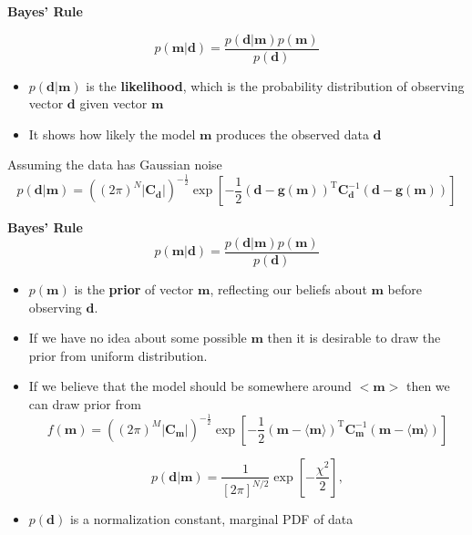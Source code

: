 \documentclass[aspectratio=169]{beamer}
\begin{document}
\begin{frame}{\textbf{Bayes' Rule}} 

\[ p(\mathbf{m}| \mathbf{d}) = \frac{ p(\mathbf{d}| \mathbf{m}) p(\mathbf{m})}{p(\mathbf{d})}  \]

\begin{itemize}
  \item [$-$] $p(\mathbf{d} | \mathbf{m})$  is the \textbf{likelihood}, which is the probability distribution of observing vector $\mathbf{d}$ given vector $\mathbf{m}$
  \item [$-$] It shows how likely the model $\mathbf{m}$ produces the observed data $\mathbf{d}$
\end{itemize}
Assuming the data has Gaussian noise
\[
p(\mathbf{d} | \mathbf{m}) = \left((2\pi)^N |\mathbf{C}_{\mathbf{d}}|\right)^{-\frac{1}{2}}
\exp\left[ -\frac{1}{2} (\mathbf{d} - \mathbf{g}(\mathbf{m}))^\text{T} \mathbf{C}_{\mathbf{d}}^{-1} (\mathbf{d} - \mathbf{g}(\mathbf{m})) \right]
\]

\end{frame}


\begin{frame}{\textbf{Bayes' Rule}} 
\[ p(\mathbf{m}| \mathbf{d}) = \frac{ p(\mathbf{d}| \mathbf{m}) p(\mathbf{m})}{p(\mathbf{d})}  \]

\begin{itemize}
  \item [$-$] $p(\mathbf{m})$ is the \textbf{prior} of vector $\mathbf{m}$, reflecting our beliefs about $\mathbf{m}$ before observing $\mathbf{d}$.
  \item [$-$] If we have no idea about some possible $\mathbf{m}$ then it is desirable to draw the prior from uniform distribution.
  \item [$-$] If we believe that the model should be somewhere around $<\mathbf{m}>$ then we can draw prior from 
 \[
f(\mathbf{m}) = \left((2\pi)^M |\mathbf{C}_{\mathbf{m}}|\right)^{-\frac{1}{2}} 
\exp\left[ -\frac{1}{2} (\mathbf{m} - \langle\mathbf{m}\rangle)^\text{T} \mathbf{C}_{\mathbf{m}}^{-1} (\mathbf{m} - \langle\mathbf{m}\rangle) \right]
\] 

\[
p(\mathbf{d}|\mathbf{m}) = \frac{1}{[2\pi]^{N/2}} \exp\left[ -\frac{\chi^2}{2} \right], 
\]
\item $p(\mathbf{d})$ is a normalization constant, marginal PDF of data
\end{itemize}
\end{frame} 
\end{document}
